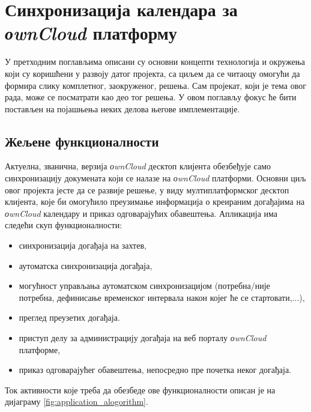 \chapter{Синхронизација календара за \textit{оwnCloud} платформу}
\label{chap:ownCloudCalendarSynchronization}

У претходним поглављима описани су основни концепти технологија и окружења који су коришћени у развоју датог пројекта, са циљем да се читаоцу омогући да формира слику комплетног, заокруженог, решења. Сам пројекат, који је тема овог рада, може се посматрати као део тог решења. У овом поглављу фокус ће бити постављен на појашњења неких делова његове имплементације.

\section{Жељене функционалности}

Актуелна, званична, верзија \textit{оwnCloud} десктоп клијента обезбеђује само синхронизацију докумената који се налазе на \textit{оwnCloud} платформи. Основни циљ овог пројекта јесте да се развије решење, у виду мултиплатформског десктоп клијента, које би омогућило преузимање информација о креираним догађајима на \textit{оwnCloud} календару и приказ одговарајућих обавештења. Апликација има следећи скуп функционалности:
\begin{itemize}
	\item{синхронизација догађаја на захтев},
	\item{аутоматска синхронизација догађаја},
	\item{могућност управљања аутоматском синхронизацијом (потребна/није потребна, дефинисање временског интервала након којег ће се стартовати,...)},
	\item{преглед преузетих догађаја}.
	\item{приступ делу за администрацију догађаја на веб порталу \textit{оwnCloud} платформе},
	\item{приказ одговарајућег обавештења, непосредно пре почетка неког догађаја}.	
\end{itemize}

Ток активности које треба да обезбеде ове функционалности описан је на дијаграму \ref{fig:application_alogorithm}.

